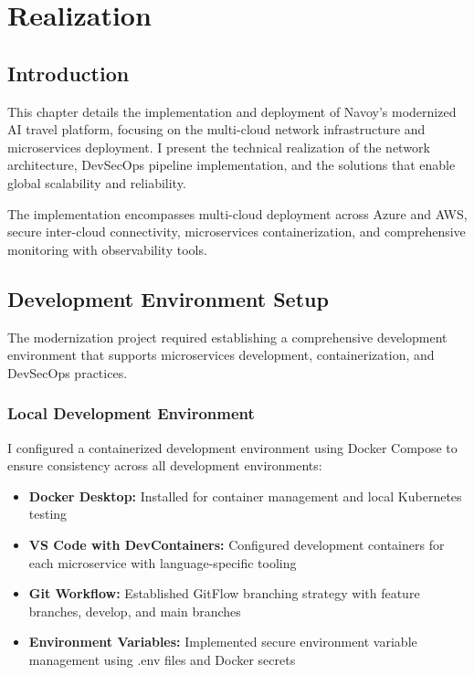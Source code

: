 \chapter{Realization}
\minitoc
\newpage

\setcounter{secnumdepth}{0} %
\section{Introduction}
This chapter details the implementation and deployment of Navoy's modernized AI travel platform, focusing on the multi-cloud network infrastructure and microservices deployment. I present the technical realization of the network architecture, DevSecOps pipeline implementation, and the solutions that enable global scalability and reliability.

The implementation encompasses multi-cloud deployment across Azure and AWS, secure inter-cloud connectivity, microservices containerization, and comprehensive monitoring with observability tools.

\setcounter{secnumdepth}{2} %
\section{Development Environment Setup}
The modernization project required establishing a comprehensive development environment that supports microservices development, containerization, and DevSecOps practices.

\subsection{Local Development Environment}
I configured a containerized development environment using Docker Compose to ensure consistency across all development environments:

\begin{itemize}
    \item \textbf{Docker Desktop:} Installed for container management and local Kubernetes testing
    \item \textbf{VS Code with DevContainers:} Configured development containers for each microservice with language-specific tooling
    \item \textbf{Git Workflow:} Established GitFlow branching strategy with feature branches, develop, and main branches
    \item \textbf{Environment Variables:} Implemented secure environment variable management using .env files and Docker secrets
\end{itemize}


